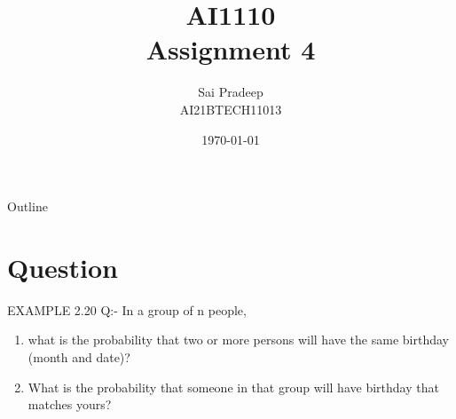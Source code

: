 \usepackage{longtable}                                        
\usepackage{calc}                                             
\usepackage{multirow}                                         
\usepackage{hhline}                                           
\usepackage{ifthen}
\usepackage{caption} 
\captionsetup[table]{skip=3pt}  
\providecommand{\pr}[1]{\ensuremath{\Pr\left(#1\right)}}
\providecommand{\cbrak}[1]{\ensuremath{\left\{#1\right\}}}
\renewcommand{\thefigure}{\arabic{table}}
\renewcommand{\thetable}{\arabic{table}}                                     

\title{AI1110 \\ Assignment 4}
\author{Sai Pradeep \\ AI21BTECH11013}
\date{\today}



	\begin{frame}
		\titlepage
	\end{frame}
	\begin{frame}{Outline}
		\tableofcontents
	\end{frame}
	
	\section{Question}
	\begin{frame}{EXAMPLE 2.20}
Q:-	In a group of n people,
	\begin{enumerate}[label=(\alph*)]
		\item what is the probability that two or more persons will have
		the same birthday (month and date)?
		\item  What is the probability that someone in that
		group will have birthday that matches yours? 
	\end{enumerate}
	\end{frame}
	
